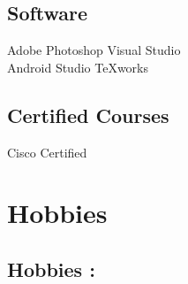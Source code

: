 \documentclass[a4paper]{manish-resume} %
\begin{document}
\begin{minipage}[t]{0.33\textwidth}
\subsection{Software}
Adobe Photoshop \textbullet{} Visual Studio\\  Android Studio \textbullet{} TeXworks

\sectionspace
\subsection{Certified Courses}
 \textbullet{} Cisco Certified
\sectionspace %

\section{Hobbies}
\subsection{Hobbies : }

 \textbullet{} 

 \textbullet{} 

 \textbullet{} 

 \textbullet{} 


\sectionspace %

\end{minipage} %
\hfill
%
%
\end{document}
